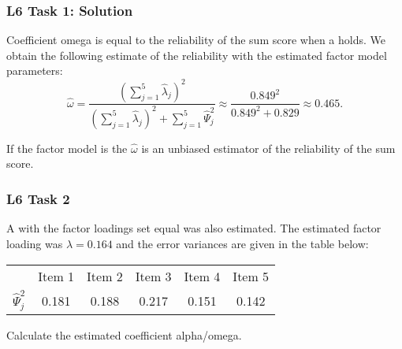 \documentclass[compress]{beamer}\usepackage[]{graphicx}\usepackage[]{xcolor}
\begin{document}
\begin{frame}[fragile]
  \frametitle{L6 Task 1: Solution}
    Coefficient omega is equal to the reliability of the sum score when a  holds. We obtain the following estimate of the reliability with the estimated factor model parameters:
      \[ \hat{\omega} = \frac{ \left( \sum_{j=1}^5 \hat{\lambda}_j \right)^2 }{\left( \sum_{j=1}^5 \hat{\lambda}_j \right)^2 + \sum_{j=1}^5 \hat{\Psi}_j^2} \approx \frac{0.849^2}{0.849^2 + 0.829} \approx 0.465. \]

    If  the factor model is the  $\hat{\omega}$ is an unbiased estimator of the reliability of the sum score.
\end{frame}


\begin{frame}[fragile]
  \frametitle{L6 Task 2}
    A  with the factor loadings set equal was also estimated. The estimated factor loading was $\hat{\lambda} = 0.164$ and the error variances are given in the table below:

    \begin{center}
      \begin{tabular}{cccccc}
        \hline
          &Item 1 &Item 2 &Item 3 &Item 4 &Item 5 \\
          $\hat{\Psi}_j^2$ &0.181 &0.188 &0.217 &0.151 &0.142 \\
        \hline
      \end{tabular}
    \end{center}

    Calculate the estimated coefficient alpha/omega.
\end{frame}
\end{document}
